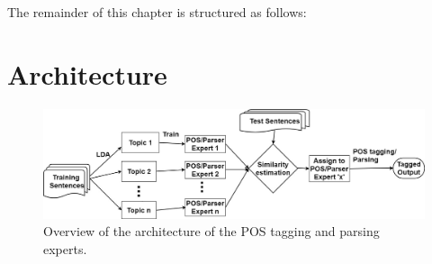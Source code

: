 
The remainder of this chapter is structured as follows: 
 


\section{Architecture}\label{problemstat}

\begin{figure}[t]
    \centering
    \includegraphics[width=\textwidth]{figures/approach-new.jpg}
 \caption{Overview of the architecture of the POS tagging and parsing experts.}\label{fig:architecture}   
 \end{figure}


